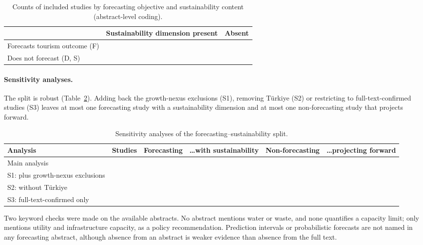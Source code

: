 \documentclass[11pt,a4paper]{article}
\begin{document}
\begin{table}[t]
\centering
\caption{Counts of included studies by forecasting objective and sustainability content (abstract-level coding).}\label{tab:split}
\begin{tabular}{@{}lcc@{}}
\toprule
 & Sustainability dimension present & Absent\\
\midrule
Forecasts tourism outcome (F) & \NFsust{} & \NFnosust{}\\
Does not forecast (D, S) & \NnonFsust{} & \NnonFnosust{}\\
\bottomrule
\end{tabular}
\end{table}

\paragraph{Sensitivity analyses.} The split is robust (Table~\ref{tab:sens}). Adding back the growth-nexus exclusions (S1), removing T\"urkiye (S2) or restricting to full-text-confirmed studies (S3) leaves at most one forecasting study with a sustainability dimension and at most one non-forecasting study that projects forward.

\begin{table}[t]\centering\small
\caption{Sensitivity analyses of the forecasting--sustainability split.}\label{tab:sens}
\begin{tabular}{@{}lccccc@{}}
\toprule
Analysis & Studies & Forecasting & \ldots with sustainability & Non-forecasting & \ldots projecting forward\\
\midrule
Main analysis & \Nsan{} & \NsaF{} & \NsaFsust{} & \NsanonF{} & \NsanonFforward{}\\
S1: plus growth-nexus exclusions & \Nsbn{} & \NsbF{} & \NsbFsust{} & \NsbnonF{} & \NsbnonFforward{}\\
S2: without T\"urkiye & \Nscn{} & \NscF{} & \NscFsust{} & \NscnonF{} & \NscnonFforward{}\\
S3: full-text-confirmed only & \Nsdn{} & \NsdF{} & \NsdFsust{} & \NsdnonF{} & \NsdnonFforward{}\\
\bottomrule
\end{tabular}
\end{table}

Two keyword checks were made on the \Nnabs{} available abstracts. No abstract mentions water or waste, and none quantifies a capacity limit; only \citet{Alamoudi2020} mentions utility and infrastructure capacity, as a policy recommendation. Prediction intervals or probabilistic forecasts are not named in any forecasting abstract, although absence from an abstract is weaker evidence than absence from the full text.
\end{document}

